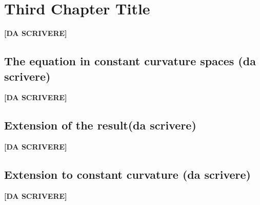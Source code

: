 \chapter{Third Chapter Title}
{\vspace{10pt}\LARGE \bf [DA SCRIVERE]}
\clearpage
\section{The equation in constant curvature spaces (da scrivere)}	
{\vspace{10pt}\LARGE \bf [DA SCRIVERE]}

\clearpage
\section{Extension of the result(da scrivere)}	
{\vspace{10pt}\LARGE \bf [DA SCRIVERE]}

\clearpage
\section{Extension to constant curvature (da scrivere)}	
{\vspace{10pt}\LARGE \bf [DA SCRIVERE]}
